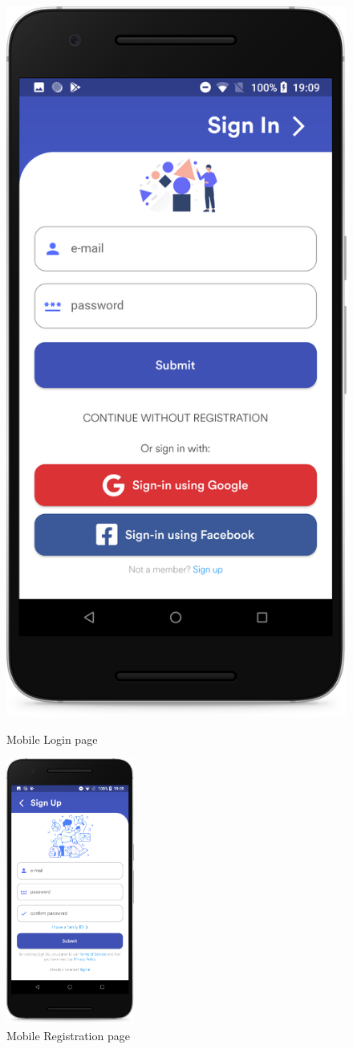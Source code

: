 \vspace*{-0.3cm}
\begin{figure}[H]
  \begin{minipage}{0.5\textwidth}
  \centering
    \includegraphics[width=42.mm,scale=0.9]{./Images//Mobile_mocks/Login.png}
    \vspace*{-0.3cm}
    \caption{Mobile Login page}
    \end{minipage}
\hfill
   \begin{minipage}{0.5\textwidth}
     \centering
     \includegraphics[width=42mm,scale=0.9]{./Images//Mobile_mocks/registration.png}
     \vspace*{-0.3cm}
     \caption{Mobile Registration page}
   \end{minipage}
\end{figure}

